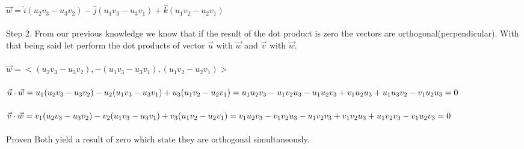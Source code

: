 \documentclass{article}
\begin{document}
\begin{enumerate}[a.]
$\vec{w} = \hat{i}(u_{2}v_{3}-u_{3}v_{2})-\hat{j}(u_{1}v_{3}-u_{3}v_{1})+\hat{k}(u_{1}v_{2}-u_{2}v_{1})$\\
\\
Step 2. From our previous knowledge we know that if the result of the dot product is zero the vectors are orthogonal(perpendicular). With that being said let perform the dot products of vector $\vec{u}$ with $\vec{w}$ and $\vec{v}$ with $\vec{w}$.\\
\\
$\vec{w} = <(u_{2}v_{3}-u_{3}v_{2}),-(u_{1}v_{3}-u_{3}v_{1}),(u_{1}v_{2}-u_{2}v_{1})>$\\
\\
$\vec{u}\cdot\vec{w}=u_{1}(u_{2}v_{3}-u_{3}v_{2})-u_{2}(u_{1}v_{3}-u_{3}v_{1})+u_{3}(u_{1}v_{2}-u_{2}v_{1})\\=u_{1}u_{2}v_{3}-u_{1}v_{2}u_{3}-u_{1}u_{2}v_{3}+v_{1}u_{2}u_{3}+u_{1}u_{3}v_{2}-v_{1}u_{2}u_{3}=0$\\
\\ 
$\vec{v}\cdot\vec{w}=v_{1}(u_{2}v_{3}-u_{3}v_{2})-v_{2}(u_{1}v_{3}-u_{3}v_{1})+v_{3}(u_{1}v_{2}-u_{2}v_{1})\\=v_{1}u_{2}v_{3}-v_{1}v_{2}u_{3}-u_{1}v_{2}v_{3}+v_{1}v_{2}u_{3}+u_{1}v_{2}v_{3}-v_{1}u_{2}v_{3}=0$\\
\\
Proven Both yield a result of zero which state they are orthogonal simultaneously.
\end{enumerate}
\end{document}
